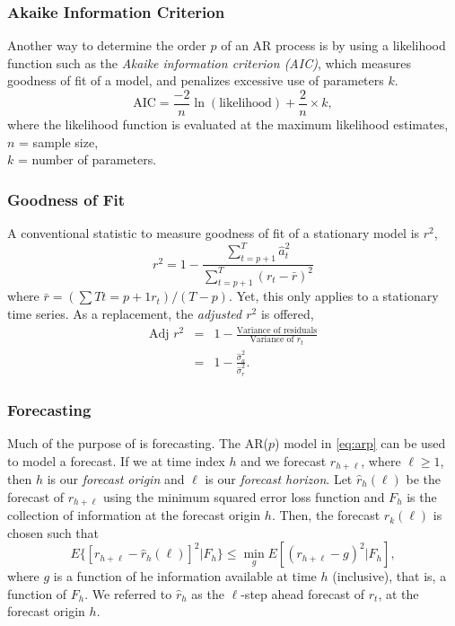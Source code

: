 \subsubsection{Akaike Information Criterion}
Another way to determine the order $p$ of an AR process is by using a likelihood function such as the \emph{Akaike information criterion (AIC)}, which measures goodness of fit of a model, and penalizes excessive use of parameters $k$.
\begin{equation}
\mathrm{AIC}=\frac{-2}{n} \ln(\text{likelihood}) + \frac{2}{n} \times k,
\label{eq:aic}
\end{equation}
where the likelihood function is evaluated at the maximum likelihood estimates, \\
$n$ = sample size, \\
$k$ = number of parameters.

\subsubsection{Goodness of Fit}
A conventional statistic to measure goodness of fit of a stationary model is $r^2$,
\begin{equation}
r^2 = 1 - \frac{\sum^T_{t=p+1}\hat{a}^2_t}{\sum^T_{t=p+1}(r_t-\bar{r})^2}
\end{equation}
where $\bar{r}= \left( \sum{T}{t=p+1} r_t\right) / (T-p)$. Yet, this only applies to a stationary time series. As a replacement, the \emph{adjusted $r^2$} is offered,
\begin{eqnarray*}
\text{Adj $r^2$} &=& 1 - \frac{\text{Variance of residuals}}{\text{Variance of $r_t$}} \\
&=& 1- \frac{\hat{\sigma}^2_a}{\hat{\sigma}^2_r}.
\end{eqnarray*}


\subsubsection{Forecasting}
Much of the purpose of \fts{} is forecasting. The AR($p$) model in \eqref{eq:arp} can be used to model a forecast. If we at time index $h$ and we forecast $r_{h+\ell}$, where $\ell \ge 1$, then $h$ is our \emph{forecast origin} and $\ell$ is our \emph{forecast horizon}. Let $\hat{r}_h(\ell)$ be the forecast of $r_{h+\ell}$ using the minimum squared error loss function and $F_h$ is the collection of information at the forecast origin $h$. Then, the forecast $\hat{r}_k(\ell)$ is chosen such that
\[
E\{[r_{h+\ell} - \hat{r}_h(\ell)]^2 | F_h \} \le \min_g E[(r_{h+\ell}-g)^2 | F_h],
\]
where $g$ is a function of he information available at time $h$ (inclusive), that is, a function of $F_h$. We referred to $\hat{r}_h$ as the $\ell$-step ahead forecast of $r_t$, at the forecast origin $h$.

